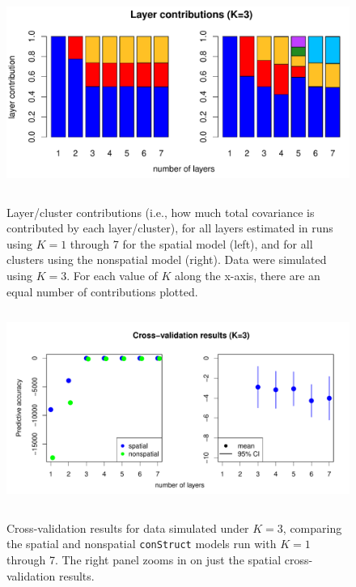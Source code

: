 \documentclass[10pt,letterpaper]{article}
\begin{document}
\begin{figure}
	\centering
		{\includegraphics[width=5in,height=2.5in]{figs/sims/simK3_laycon_barplots.pdf}}
		\caption{
			Layer/cluster contributions (i.e., how much total covariance is contributed by each layer/cluster), 
			for all layers estimated in runs using $K = 1$ through 7 
			for the spatial model (left), 
			and for all clusters using the nonspatial model (right).
			Data were simulated using $K=3$.
			For each value of $K$ along the x-axis, there are an equal number of contributions plotted.
		}\label{simK3_laycon}
\end{figure}

\begin{figure}
	\centering
		{\includegraphics[width=5in,height=2.5in]{figs/sims/simK3_std_xval.pdf}}
		\caption{
			Cross-validation results for data simulated under $K=3$,
			comparing the spatial and nonspatial \texttt{conStruct} models run with $K=1$ through 7.  
			The right panel zooms in on just the spatial cross-validation results.
		}\label{simK3_xval}
\end{figure}
\end{document}
